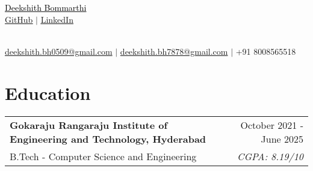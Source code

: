 \documentclass[a4paper,10pt]{article}
\newcommand{\sectionheader}[2]{%
    \begin{center}
        \textcolor{myblue}{\Huge #1} \\[6pt]
        \textcolor{mydarkblue}{\underline{\href{#2}{\raisebox{-0.05\height}{\faGithub} GitHub}} $|$}
        \textcolor{mydarkblue}{\underline{\href{https://www.linkedin.com/in/deekshith-bommarthi/}{\raisebox{-0.05\height}{\faLinkedin} LinkedIn}}}
    \end{center}
}
\newcommand{\sectionheader}[2]{%
    \begin{center}
        \vspace*{-\baselineskip} %
        \textcolor{myblue}{\Huge #1} \\[6pt]
        \vspace{-8pt} %
        \textcolor{mydarkblue}{\underline{\href{#2}{\raisebox{-0.05\height}{\faGithub} GitHub}} $|$}
        \textcolor{mydarkblue}{\underline{\href{https://www.linkedin.com/in/deekshith-bommarthi/}{\raisebox{-0.05\height}{\faLinkedin} LinkedIn}}}
    \end{center}
}
\begin{document}
\begin{center}
    \parbox{\linewidth}{%
        \centering
        \sectionheader{\href{https://deekshith0509.github.io/Portfolio.html}{\textcolor{black}{Deekshith Bommarthi}}}{https://github.com/deekshith0509/} \\[2pt]
        \textcolor{mydarkblue}{\raisebox{-0.05\height}{\faEnvelope} \href{mailto:deekshith.bh0509@gmail.com}{deekshith.bh0509@gmail.com}} $|$
        \textcolor{mydarkblue}{\href{mailto:deekshith.bh7878@gmail.com}{deekshith.bh7878@gmail.com}} $|$
        \textcolor{mydarkblue}{\raisebox{-0.05\height}{\faMobile} +91 8008565518} \\
    }
\end{center}


\section*{Education}
\vspace{5pt}

\begin{tabularx}{\linewidth}{@{} l r @{}}
    \color{myblue} \textbf{Gokaraju Rangaraju Institute of Engineering and Technology, Hyderabad} & \hspace{3.5cm}  \color{mydarkblue} October 2021 - June 2025 \\[1pt] %
    \color{mydarkblue} B.Tech - Computer Science and Engineering &  \vspace{-10pt}\color{mylightpurple} \textit{CGPA: 8.19/10} \\[10pt] %

\end{tabularx}


\newcommand{\skillsentry}[2]{%
    \textcolor{myblue}{\textbf{#1}} & \textcolor{mydarkblue}{#2} \\
}
\newcommand{\skillsentry}[2]{%
    \textcolor{myblue}{\textbf{#1}} & \textcolor{mydarkblue}{#2} \\
}
\vspace{-3pt}
\end{document}
